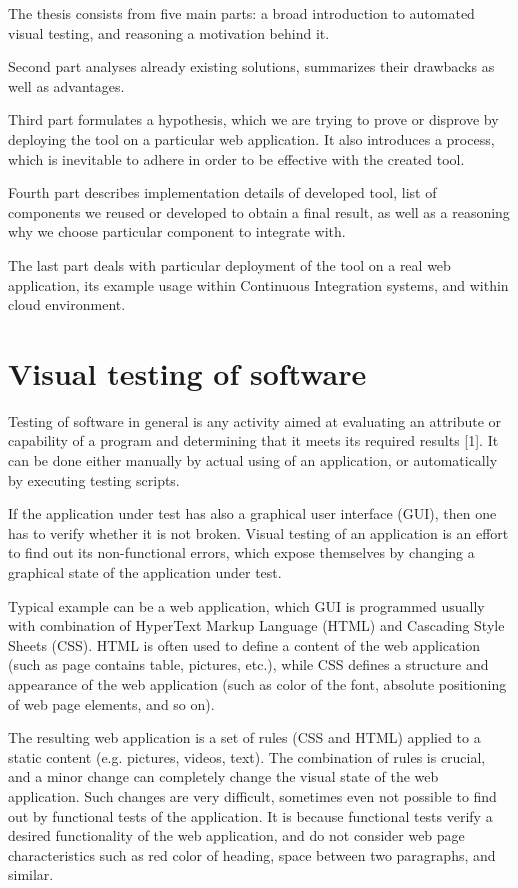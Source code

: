 \documentclass[11pt,oneside,final]{fithesis2}
\begin{document}
The thesis consists from five main parts: a broad introduction to automated visual testing, and reasoning
a motivation behind it.

Second part analyses already existing solutions, summarizes their drawbacks as well as advantages.

Third part formulates a hypothesis, which we are trying to prove or disprove by deploying the tool on
a particular web application. It also introduces a process, which is inevitable to adhere in order to
be effective with the created tool.

Fourth part describes implementation details of developed tool, list of components we reused
or developed to obtain a final result, as well as a reasoning why we choose particular component 
to integrate with.

The last part deals with particular deployment of the tool on a real web application, its example usage
within Continuous Integration systems, and within cloud environment.
    
\chapter{Visual testing of software}    
    Testing of software in general is any activity aimed at evaluating an attribute or capability of a program and determining that it meets its required results [1]. 
    It can be done either manually by actual using of an application, or automatically by executing testing scripts.
    
    If the application under test has also a graphical user interface (GUI), then one has to verify whether it is not broken. 
    Visual testing of an application is an effort to find out its non-functional errors, which expose themselves by changing a graphical state of the application under test.
    
    Typical example can be a web application, which GUI is programmed usually with combination of HyperText Markup Language (HTML) and Cascading Style Sheets (CSS). 
    HTML is often used to define a content of the web application (such as page contains table, pictures, etc.), while CSS defines a structure and appearance of the 
    web application (such as color of the font, absolute positioning of web page elements, and so on).
    
    The resulting web application is a set of rules (CSS and HTML) applied to a static content (e.g. pictures, videos, text). The combination of rules is crucial, and a minor change
    can completely change the visual state of the web application. Such changes are very difficult, sometimes even not possible to find out by functional tests of the application. 
    It is because functional tests verify a desired functionality of the web application, and do not consider web page characteristics such as red color of heading, 
    space between two paragraphs, and similar.
    
\end{document}
